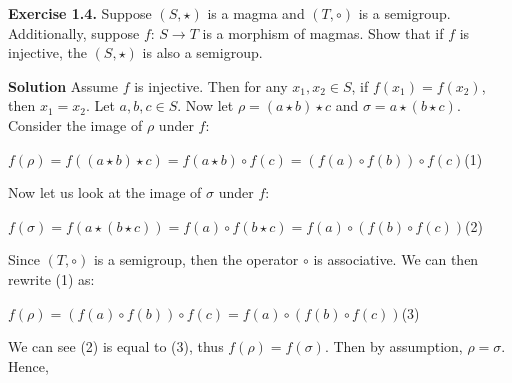 \documentclass[12pt, a4paper]{article}
\begin{document}
\begin{flushleft}
\hfil\textbf{Exercise 1.4.} Suppose $(S, \star)$ is a magma and $(T, \circ)$ is a semigroup. Additionally, suppose $f$: $S\rightarrow T$ is a morphism of magmas. Show that if $f$ is injective, the $(S, \star)$ is also a semigroup. 
\end{flushleft}

\begin{flushleft}
\textbf{Solution} Assume $f$ is injective. Then for any $x_1,x_2\in S$, if $f(x_1)=f(x_2)$, then $x_1=x_2$. Let $a,b,c\in S$. Now let $\rho=(a\star b)\star c$ and $\sigma=a\star(b\star c)$. Consider the image of $\rho$ under $f$:\linebreak
\hfil
\hfil
\hfil
\hfil
\end{flushleft}

\begin{flushright}
\hfil$f(\rho)=f((a\star b)\star c)=f(a\star b)\circ f(c)=(f(a)\circ f(b))\circ f(c)$\hfil\hfil(1)\linebreak
\end{flushright}

\begin{flushleft}
Now let us look at the image of $\sigma$ under $f$:\linebreak
\hfil
\hfil
\hfil
\hfil
\end{flushleft}

\begin{flushright}
\hfil$f(\sigma)=f(a\star (b\star c))=f(a)\circ f(b\star c)=f(a)\circ (f(b)\circ f(c))$\hfil\hfil(2)\linebreak
\end{flushright}

\begin{flushleft}
Since $(T, \circ)$ is a semigroup, then the operator $\circ$ is associative. We can then rewrite (1) as:\linebreak
\hfil
\hfil
\hfil
\hfil
\end{flushleft}

\begin{flushright}
\hfil$f(\rho)=(f(a)\circ f(b))\circ f(c)=f(a)\circ (f(b)\circ f(c))$\hfil\hfil(3)\linebreak
\end{flushright}

\begin{flushleft}
We can see (2) is equal to (3), thus $f(\rho)=f(\sigma)$. Then by assumption, $\rho=\sigma$. Hence,\linebreak
\hfil
\hfil
\hfil
\hfil
\end{flushleft}
\end{document}
